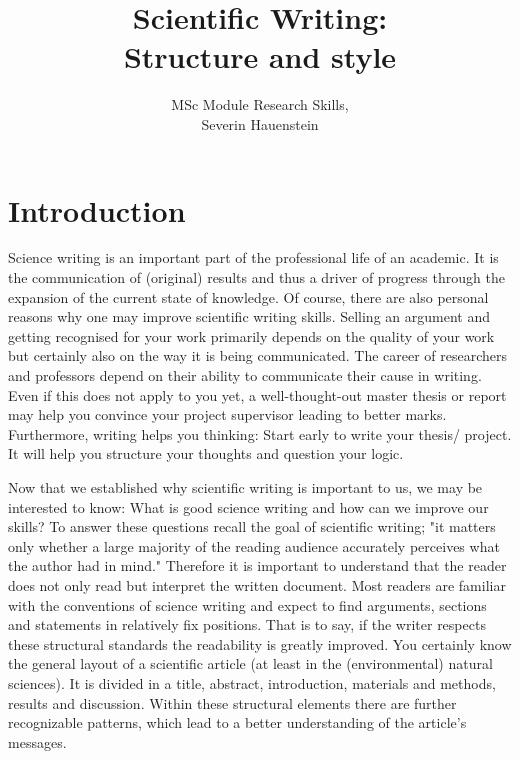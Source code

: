 \documentclass[justified, notoc]{tufte-book} %
\title{Scientific Writing:\\
	\large{Structure and style}}
\author{MSc Module Research Skills,\\
	\small{Severin Hauenstein}}
\begin{document}
	\let\cleardoublepage\clearpage
	\maketitle
	\thispagestyle{empty}
	\null
	\vfill
\begin{fullwidth}
	\tableofcontents
\end{fullwidth}


\chapter{Introduction}

Science writing is an important part of the professional life of an academic. It is the communication of (original) results and thus a driver of progress through the expansion of the current state of knowledge.
Of course, there are also personal reasons why one may improve scientific writing skills. Selling an argument and getting recognised for your work primarily depends on the quality of your work but certainly also on the way it is being communicated. 
The career of researchers and professors depend on their ability to communicate their cause in writing. Even if this does not apply to you yet, a well-thought-out master thesis or report may help you convince your project supervisor leading to better marks.  
Furthermore, writing helps you thinking: Start early to write your thesis/ project. It will help you structure your thoughts and question your logic.

Now that we established why scientific writing is important to us, we may be interested to know: What is good science writing and how can we improve our skills? 
To answer these questions recall the goal of scientific writing; "it matters only whether a large majority of the reading audience accurately perceives what the author had in mind." Therefore it is important to understand that the reader does not only read but interpret the written document. Most readers are familiar with the conventions of science writing and expect to find arguments, sections and statements in relatively fix positions. That is to say, if the writer respects these structural standards the readability is greatly improved. 
You certainly know the general layout of a scientific article (at least in the (environmental) natural sciences). It is divided in a title, abstract, introduction, materials and methods, results and discussion. Within these structural elements there are further recognizable patterns, which lead to a better understanding of the article's messages.  
\end{document}

